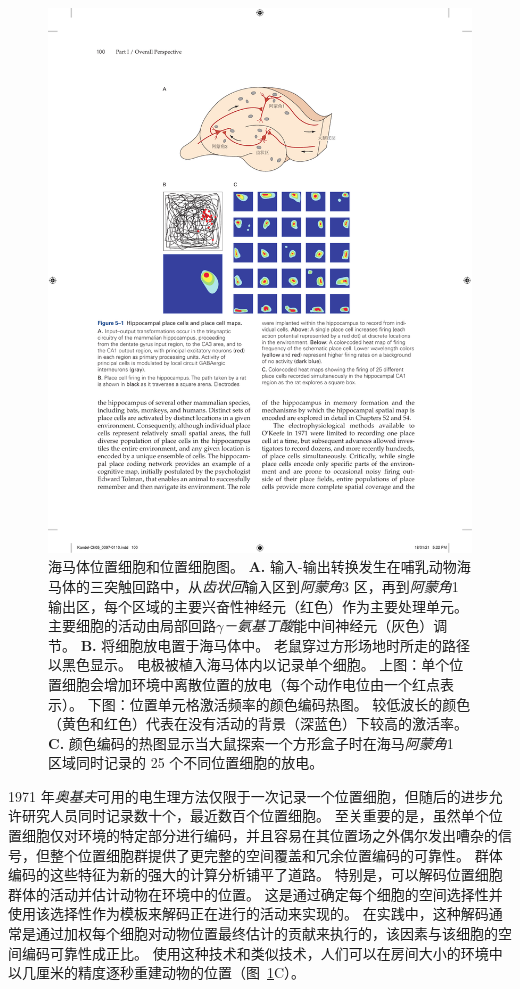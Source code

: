 \begin{figure}[htbp]
	\centering
	\includegraphics[width=0.9\linewidth]{chap05/fig_5_1}
	\caption{海马体位置细胞和位置细胞图。 
		\textbf{A.} 输入-输出转换发生在哺乳动物海马体的三突触回路中，从\textit{齿状回}输入区到\textit{阿蒙角}3 区，再到\textit{阿蒙角}1 输出区，每个区域的主要兴奋性神经元（红色）作为主要处理单元。
		主要细胞的活动由局部回路\textit{$\gamma$－氨基丁酸}能中间神经元（灰色）调节。
		\textbf{B.} 将细胞放电置于海马体中。
		老鼠穿过方形场地时所走的路径以黑色显示。
		电极被植入海马体内以记录单个细胞。
		上图：单个位置细胞会增加环境中离散位置的放电（每个动作电位由一个红点表示）。
		下图：位置单元格激活频率的颜色编码热图。
		较低波长的颜色（黄色和红色）代表在没有活动的背景（深蓝色）下较高的激活率。 
		\textbf{C.} 颜色编码的热图显示当大鼠探索一个方形盒子时在海马\textit{阿蒙角}1 区域同时记录的 25 个不同位置细胞的放电。}
	\label{fig:5_1}
\end{figure}


1971 年\textit{奥基夫}可用的电生理方法仅限于一次记录一个位置细胞，但随后的进步允许研究人员同时记录数十个，最近数百个位置细胞。
至关重要的是，虽然单个位置细胞仅对环境的特定部分进行编码，并且容易在其位置场之外偶尔发出嘈杂的信号，但整个位置细胞群提供了更完整的空间覆盖和冗余位置编码的可靠性。
群体编码的这些特征为新的强大的计算分析铺平了道路。
特别是，可以解码位置细胞群体的活动并估计动物在环境中的位置。
这是通过确定每个细胞的空间选择性并使用该选择性作为模板来解码正在进行的活动来实现的。
在实践中，这种解码通常是通过加权每个细胞对动物位置最终估计的贡献来执行的，该因素与该细胞的空间编码可靠性成正比。
使用这种技术和类似技术，人们可以在房间大小的环境中以几厘米的精度逐秒重建动物的位置（图~\ref{fig:5_1}C）。



